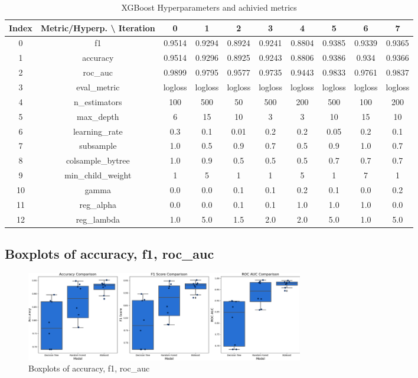 \documentclass{article}%
\begin{document}
%


\begin{table}[h!]%
\caption{XGBoost Hyperparameters and achivied metrics}%
\vspace{0.2cm}%
\centering%
\begin{tabular}{|c||c||c||c||c||c||c||c||c||c|}%
\hline%
Index&Metric/Hyperp. \textbackslash{} Iteration&0&1&2&3&4&5&6&7\\%
\hline%
0&f1&0.9514&0.9294&0.8924&0.9241&0.8804&0.9385&0.9339&0.9365\\%
1&accuracy&0.9514&0.9296&0.8925&0.9243&0.8806&0.9386&0.934&0.9366\\%
2&roc\_auc&0.9899&0.9795&0.9577&0.9735&0.9443&0.9833&0.9761&0.9837\\%
3&eval\_metric&logloss&logloss&logloss&logloss&logloss&logloss&logloss&logloss\\%
4&n\_estimators&100&500&50&500&200&500&100&200\\%
5&max\_depth&6&15&10&3&3&10&15&10\\%
6&learning\_rate&0.3&0.1&0.01&0.2&0.2&0.05&0.2&0.1\\%
7&subsample&1.0&0.5&0.9&0.7&0.5&0.9&1.0&0.7\\%
8&colsample\_bytree&1.0&0.9&0.5&0.5&0.5&0.7&0.7&0.7\\%
9&min\_child\_weight&1&5&1&1&5&1&7&1\\%
10&gamma&0.0&0.0&0.1&0.1&0.2&0.1&0.0&0.2\\%
11&reg\_alpha&0.0&0.0&0.1&0.1&1.0&1.0&1.0&0.0\\%
12&reg\_lambda&1.0&5.0&1.5&2.0&2.0&5.0&1.0&5.0\\%
\hline%
\end{tabular}%
\end{table}

%
\newpage%
\subsection{Boxplots of accuracy, f1, roc\_auc}%
\label{subsec:Boxplotsofaccuracy,f1,rocauc}%


\begin{figure}[h!]%
\centering%
\includegraphics[width=460px]{ModelOptimization/box_plots_metrics.png}%
\caption{Boxplots of accuracy, f1, roc\_auc}%
\end{figure}
\end{document}
